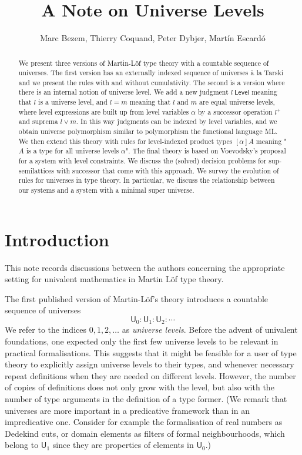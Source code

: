 \documentclass[11pt,a4paper]{article}
\def\UU{\mathsf{U}}
\def\Level{\mathsf{Level}}
\begin{document}
\title{A Note on Universe Levels}

\author{Marc Bezem, Thierry Coquand, Peter Dybjer, Mart\'in Escard\'o}
\date{}
\maketitle

\begin{abstract}
We present three versions of Martin-Löf type theory with a countable sequence of universes. The first version has an externally indexed sequence of universes \`a la Tarski and we present the rules with and without cumulativity. The second is a version where there is an internal notion of universe level. We add a new judgment $l\ \Level$ meaning that $l$ is a universe level, and $l = m$ meaning that $l$ and $m$ are equal universe levels, where level expressions are built up from level variables $\alpha$ by a successor operation $l^+$ and suprema $l \vee m$. In this way judgments can be indexed by level variables, and we obtain universe polymorphism similar to polymorphism the functional language ML.
We then extend this theory with rules for level-indexed product types $[\alpha]A$ meaning "$A$ is a type for all universe levels $\alpha$". The final theory is based on Voevodsky's proposal for a system with level constraints. We discuss the (solved) decision problems for sup-semilattices with
successor that come with this approach. We survey the evolution of rules for universes in type theory. In particular, we discuss the relationship between our systems and a system with a minimal super universe.
\end{abstract}


\section{Introduction}\label{sec:intros}

This note records discussions between the authors concerning the appropriate setting for univalent mathematics in Martin Löf type theory.

The first published version of Martin-Löf's theory \cite{martinlof:predicative} introduces a countable sequence of universes
$$
\UU_0 : \UU_1 : \UU_2 : \cdots
$$
We refer to the indices $0, 1, 2, \ldots$ as {\em universe levels}. Before the advent of univalent foundations, one expected only the first few universe levels to be relevant in practical formalisations. This suggests that it might be feasible for a user of type theory to explicitly assign universe levels to their types, and whenever necessary repeat definitions when they are needed on different levels. However, the number of copies of definitions does not only grow with the level, but also with the number of type arguments in the definition of a type former. (We remark that universes are more important in a predicative framework than in an impredicative one. Consider for example the formalisation of real numbers as Dedekind cuts, or domain elements as filters of formal neighbourhoods, which belong to $\UU_1$ since they are properties of elements in $\UU_0$.)
\end{document}
